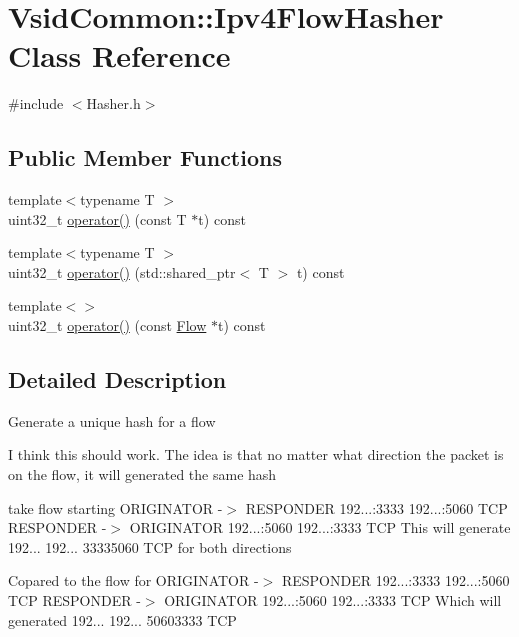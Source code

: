 \hypertarget{class_vsid_common_1_1_ipv4_flow_hasher}{\section{Vsid\-Common\-:\-:Ipv4\-Flow\-Hasher Class Reference}
\label{class_vsid_common_1_1_ipv4_flow_hasher}
}


{\ttfamily \#include $<$Hasher.\-h$>$}

\subsection*{Public Member Functions}
\begin{DoxyCompactItemize}
\item 
{\footnotesize template$<$typename T $>$ }\\uint32\-\_\-t \hyperlink{class_vsid_common_1_1_ipv4_flow_hasher_a31d6f446e05bd50772dbae1ab1550c01}{operator()} (const T $\ast$t) const 
\item 
{\footnotesize template$<$typename T $>$ }\\uint32\-\_\-t \hyperlink{class_vsid_common_1_1_ipv4_flow_hasher_a5a67c74cc52946c6ce4b1467849cb9df}{operator()} (std\-::shared\-\_\-ptr$<$ T $>$ t) const 
\item 
{\footnotesize template$<$$>$ }\\uint32\-\_\-t \hyperlink{class_vsid_common_1_1_ipv4_flow_hasher_a9d78e9057c00a8cc86f248b066e42205}{operator()} (const \hyperlink{class_vsid_common_1_1_flow}{Flow} $\ast$t) const 
\end{DoxyCompactItemize}


\subsection{Detailed Description}
Generate a unique hash for a flow

I think this should work. The idea is that no matter what direction the packet is on the flow, it will generated the same hash

take flow starting O\-R\-I\-G\-I\-N\-A\-T\-O\-R -\/$>$ R\-E\-S\-P\-O\-N\-D\-E\-R 192...\-:3333 192...\-:5060 T\-C\-P R\-E\-S\-P\-O\-N\-D\-E\-R -\/$>$ O\-R\-I\-G\-I\-N\-A\-T\-O\-R 192...\-:5060 192...\-:3333 T\-C\-P This will generate 192... 192... 33335060 T\-C\-P for both directions

Copared to the flow for O\-R\-I\-G\-I\-N\-A\-T\-O\-R -\/$>$ R\-E\-S\-P\-O\-N\-D\-E\-R 192...\-:3333 192...\-:5060 T\-C\-P R\-E\-S\-P\-O\-N\-D\-E\-R -\/$>$ O\-R\-I\-G\-I\-N\-A\-T\-O\-R 192...\-:5060 192...\-:3333 T\-C\-P Which will generated 192... 192... 50603333 T\-C\-P

